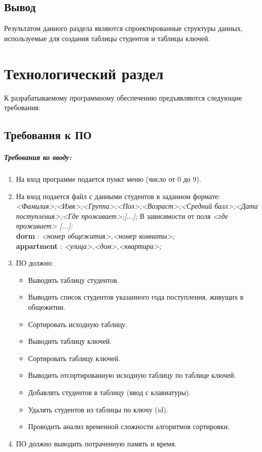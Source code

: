 \section{Вывод}

Результатом данного раздела являются спроектированные структуры данных, используемые для создания таблицы студентов и таблицы ключей.

\chapter{Технологический раздел}

К разрабатываемому программному обеспечению предъявляются следующие требования:

\section{Требования к ПО}

\paragraph{Требования ко вводу: }

\begin{enumerate}
	\item На вход программе подается пункт меню (число от 0 до 9).
	\item На вход подается файл с данными студентов в заданном формате: \\
	\textit{<Фамилия>;<Имя>;<Группа>;<Пол>;<Возраст>;<Средний балл>;<Дата поступления>;<Где проживает>;[...];} В зависимости от поля \textit{<где проживает> [...]:} \\
	\textbf{dorm} : \textit{<номер общежития>,<номер комнаты>;} \\
	\textbf{appartment} : \textit{<улица>,<дом>,<квартира>;}
	\item ПО должно:
	\begin{itemize}
		\item Выводить таблицу студентов.
		\item Выводить список студентов указанного года поступления, живущих в общежитии.
		\item Сортировать исходную таблицу.
		\item Выводить таблицу ключей.
		\item Сортировать таблицу ключей.
		\item Выводить отсортированную исходную таблицу по таблице ключей.
		\item Добавлять студентов в таблицу (ввод с клавиатуры).
		\item Удалять студентов из таблицы по ключу (id).
		\item Проводить анализ временной сложности алгоритмов сортировки.
	\end{itemize}
	\item ПО должно выводить потраченную память и время.
\end{enumerate}

